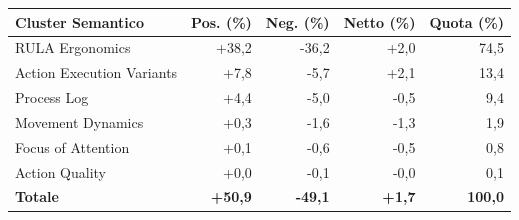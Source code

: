 \begin{tabular*}{\linewidth}{@{}l@{\extracolsep{\fill}}rrrr@{}}
\toprule
\textbf{Cluster Semantico} & \textbf{Pos. (\%)} & \textbf{Neg. (\%)} & \textbf{Netto (\%)} & \textbf{Quota (\%)} \\
\midrule
RULA Ergonomics & +38{,}2 & -36{,}2 & +2{,}0 & 74{,}5 \\
Action Execution Variants & +7{,}8 & -5{,}7 & +2{,}1 & 13{,}4 \\
Process Log & +4{,}4 & -5{,}0 & -0{,}5 & 9{,}4 \\
Movement Dynamics & +0{,}3 & -1{,}6 & -1{,}3 & 1{,}9 \\
Focus of Attention & +0{,}1 & -0{,}6 & -0{,}5 & 0{,}8 \\
Action Quality & +0{,}0 & -0{,}1 & -0{,}0 & 0{,}1 \\
\midrule
\textbf{Totale} & \textbf{+50{,}9} & \textbf{-49{,}1} & \textbf{+1{,}7} & \textbf{100{,}0} \\
\bottomrule
\end{tabular*}
